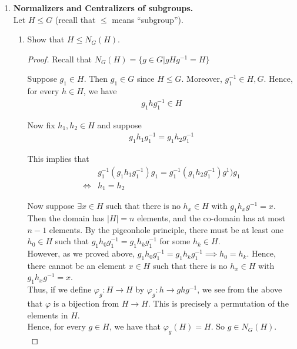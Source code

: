 \documentclass[11pt, reqno]{amsart}
\theoremstyle{plain}
\theoremstyle{definition}
\theoremstyle{example}
\begin{document}
\begin{enumerate}[1.]
\begin{enumerate}[(a)]
\begin{proof}
As a result $A \times 1$ satisfies the subgroup criterion and hence $A \times 1 \leqslant A \times B$.
\end{proof}
\end{enumerate}


\item {\bf Normalizers and Centralizers of subgroups.}\\
Let $H \leq G$ (recall that $\leq$ means ``subgroup''). 
\begin{enumerate}
\item Show that $H \leq N_G(H)$. 
\begin{proof}
Recall that $N_G(H) = \{g \in G | gHg^{-1} = H\}$

Suppose $g_1 \in H$. Then $g_1 \in G$ since $H \leqslant G$. Moreover, $g_1^{-1} \in H, G$. Hence, for every $h \in H$, we have
\begin{align*}
g_1hg_1^{-1} \in H
\end{align*}

Now fix $h_1, h_2 \in H$ and suppose
\begin{align*}
g_1h_1g_1^{-1} = g_1h_2g_1^{-1}
\end{align*}

This implies that
\begin{align*}
&g_1^{-1}(g_1h_1g_1^{-1})g_1 = g_1^{-1}(g_1h_2g_1^{-1})g^1)g_1\\
\iff &h_1 = h_2
\end{align*}

Now suppose $\exists x \in H$ such that there is no $h_x \in H$ with $g_1h_xg^{-1} = x$.\\

Then the domain has $|H| = n$ elements, and the co-domain has at most $n-1$ elements. By the pigeonhole principle, there must be at least one $h_0 \in H$ such that $g_1h_0g_1^{-1} = g_1h_kg_1^{-1}$ for some $h_k \in H$.\\

However, as we proved above, $g_1h_0g_1^{-1} = g_1h_kg_1^{-1} \implies h_0 = h_k$. Hence, there cannot be an element $x \in H$ such that there is no $h_x \in H$ with $g_1h_xg^{-1} = x$.\\

Thus, if we define $\varphi_g: H \to H$ by $\varphi_g: h \to ghg^{-1}$, we see from the above that $\varphi$ is a bijection from $H \to H$. This is precisely a permutation of the elements in $H$.\\

Hence, for every $g \in H$, we have that $\varphi_g(H) = H$. So $g \in N_G(H)$.\\


\end{proof}
\end{enumerate}
\end{enumerate}
\end{document}
